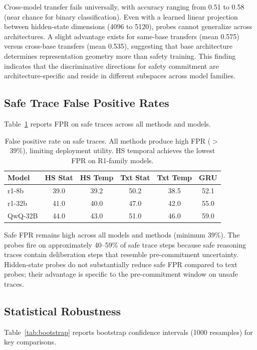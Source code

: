 \documentclass[11pt,a4paper]{article}
\begin{document}
Cross-model transfer fails universally, with accuracy ranging from 0.51 to 0.58 (near chance for binary classification). Even with a learned linear projection between hidden-state dimensions (4096 to 5120), probes cannot generalize across architectures. A slight advantage exists for same-base transfers (mean 0.575) versus cross-base transfers (mean 0.535), suggesting that base architecture determines representation geometry more than safety training. This finding indicates that the discriminative directions for safety commitment are architecture-specific and reside in different subspaces across model families.

\subsection{Safe Trace False Positive Rates}

Table~\ref{tab:safe_fpr} reports FPR on safe traces across all methods and models.

\begin{table}[t]
\centering
\small
\caption{False positive rate on safe traces. All methods produce high FPR ($>$39\%), limiting deployment utility. HS temporal achieves the lowest FPR on R1-family models.}
\label{tab:safe_fpr}
\begin{tabular}{lccccc}
\toprule
Model & HS Stat & HS Temp & Txt Stat & Txt Temp & GRU \\
\midrule
r1-8b & 39.0 & 39.2 & 50.2 & 38.5 & 52.1 \\
r1-32b & 41.0 & 40.0 & 47.0 & 42.0 & 55.0 \\
QwQ-32B & 44.0 & 43.0 & 51.0 & 46.0 & 59.0 \\
\bottomrule
\end{tabular}
\end{table}

Safe FPR remains high across all models and methods (minimum 39\%). The probes fire on approximately 40--59\% of safe trace steps because safe reasoning traces contain deliberation steps that resemble pre-commitment uncertainty. Hidden-state probes do not substantially reduce safe FPR compared to text probes; their advantage is specific to the pre-commitment window on unsafe traces.

\subsection{Statistical Robustness}

Table~\ref{tab:bootstrap} reports bootstrap confidence intervals (1000 resamples) for key comparisons.
\end{document}
